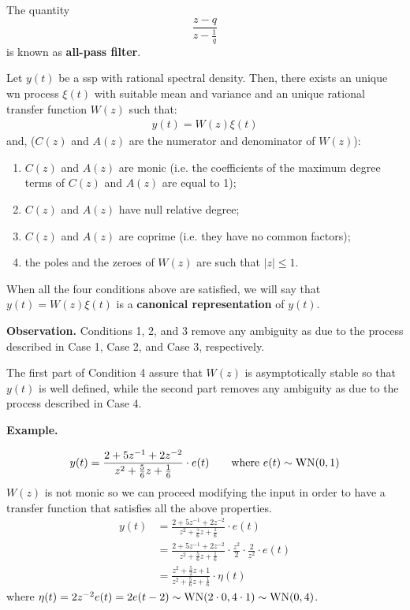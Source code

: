 
The quantity
\[
	\frac{z-q}{z-\frac{1}{q}}
\]
is known as \textbf{all-pass filter}.

\begin{theorem}
	Let $y(t)$ be a \gls{ssp} with rational spectral density. 
	Then, there exists an unique \gls{wn} process $\xi(t)$ with suitable mean and variance and an unique rational transfer function $W(z)$ such that:
	\begin{align*}
		y(t) = W(z)\xi(t)
	\end{align*}
    and, ($C(z)$ and $A(z)$ are the numerator and denominator of $W(z)$):
    \begin{enumerate}
		\item $C(z)$ and $A(z)$ are monic (i.e. the coefficients of the maximum degree terms of $C(z)$ and $A(z)$ are equal to 1);
		\item $C(z)$ and $A(z)$ have null relative degree;
		\item $C(z)$ and $A(z)$ are coprime (i.e. they have no common factors);
		\item the poles and the zeroes of $W(z)$ are such that $|z|\leq 1$.
    \end{enumerate}
\end{theorem}

When all the four conditions above are satisfied, we will say that $y(t) = W(z)\xi(t)$ is a \textbf{canonical representation} of $y(t)$.

\textbf{Observation.} Conditions 1, 2, and 3 remove any ambiguity as due to the process described in Case 1, Case 2, and Case 3, respectively. 

The first part of Condition 4 assure that $W(z)$ is asymptotically stable so that $y(t)$ is well defined, while the second part removes any ambiguity as due to the process described in Case 4.

\textbf{Example.}

\begin{align*}
	y(t)=\frac{2+5z^{-1}+2z^{-2}}{z^2+\frac{5}{6}z+\frac{1}{6}}\cdot e(t)  \qquad \text{where } e(t)\sim \operatorname{WN}(0,1)
\end{align*}
$W(z)$ is not monic so we can proceed modifying the input in order to have a transfer function that satisfies all the above properties.
\begin{align*}
	y(t)&=\frac{2+5z^{-1}+2z^{-2}}{z^2+\frac{5}{6}z+\frac{1}{6}}\cdot e(t) \\
	&=\frac{2+5z^{-1}+2z^{-2}}{z^2+\frac{5}{6}z+\frac{1}{6}}\cdot\frac{z^2}{2}\cdot\frac{2}{z^2}\cdot e(t)\\
	&=\frac{z^2+\frac{5}{2}z+1}{z^2+\frac{5}{6}z+\frac{1}{6}}\cdot \eta(t)
\end{align*}
where $\eta(t)=2z^{-2}e(t)=2e(t-2)\sim \operatorname{WN}(2\cdot0,4\cdot 1)\sim \operatorname{WN}(0,4)$.

